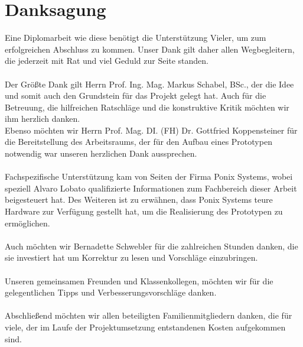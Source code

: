 \section*{Danksagung}
\cfoot{}
\setcounter{page}{7}
Eine Diplomarbeit wie diese benötigt die Unterstützung Vieler, um zum erfolgreichen Abschluss zu kommen. Unser Dank gilt daher allen Wegbegleitern, die jederzeit mit Rat und viel Geduld zur Seite standen. \\ \mbox{} \\
Der Größte Dank gilt Herrn Prof. Ing. Mag. Markus Schabel, BSc., der die Idee und somit auch den Grundstein für das Projekt gelegt hat. Auch für die Betreuung, die hilfreichen Ratschläge und die konstruktive Kritik möchten wir ihm herzlich danken. \\
Ebenso möchten wir Herrn Prof. Mag. DI. (FH) Dr. Gottfried Koppensteiner für die Bereitstellung des Arbeitsraums, der für den Aufbau eines Prototypen notwendig war unseren herzlichen Dank aussprechen. \\ \mbox{} \\
Fachspezifische Unterstützung kam von Seiten der Firma Ponix Systems, wobei speziell Alvaro Lobato qualifizierte Informationen zum Fachbereich dieser Arbeit beigesteuert hat. Des Weiteren ist zu erwähnen, dass Ponix Systems teure Hardware zur Verfügung gestellt hat, um die Realisierung des Prototypen zu ermöglichen. \\ \mbox{} \\
Auch möchten wir Bernadette Schwebler für die zahlreichen Stunden danken, die sie investiert hat um Korrektur zu lesen und Vorschläge einzubringen. \\ \mbox{} \\ 
Unseren gemeinsamen Freunden und Klassenkollegen, möchten wir für die gelegentlichen Tipps und Verbesserungsvorschläge danken. \\ \mbox{} \\
Abschließend möchten wir allen beteiligten Familienmitgliedern danken, die für viele, der im Laufe der Projektumsetzung entstandenen Kosten aufgekommen sind.
